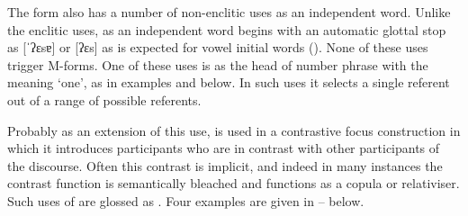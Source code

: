 The form  also has a number of non-enclitic uses as an independent word.
Unlike the enclitic uses,  as an independent word 
begins with an automatic glottal stop as [ˈʔɛsɐ] or [ʔɛs]
as is expected for vowel initial words ().
None of these uses trigger M-forms.
One of these uses is as the head of number phrase with the meaning `one',
as in examples  and  below.
In such uses it selects a single referent out of a range of possible referents.

\begin{exe}
	\label{ex:120715-1, 0.44-0.47}
	\label{ex:130906-1, 3.15}
\end{exe}

Probably as an extension of this use,
 is used in a contrastive focus construction
in which it introduces participants
who are in contrast with other participants of the discourse.
Often this contrast is implicit,
and indeed in many instances the contrast function
is semantically bleached
and  functions as a copula or relativiser.
Such uses of  are glossed as {\esc}.
Four examples are given in -- below.

